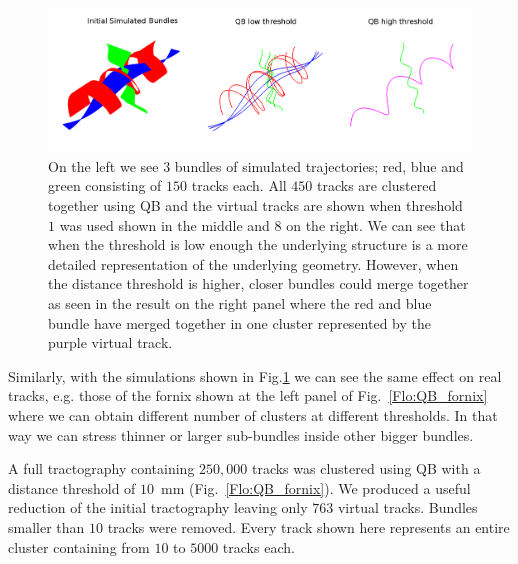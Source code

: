 \documentclass[preprint,authoryear,a4paper,10pt,onecolumn]{elsarticle}
\begin{document}
\begin{figure}
\begin{centering}
\includegraphics[scale=0.7]{last_figures/helix_phantom}
\par\end{centering}
\caption{On the left we see $3$ bundles of simulated trajectories; red,
  blue and green consisting of $150$ tracks each. All $450$ tracks are
  clustered together using QB and the virtual tracks are shown when
  threshold $1$ was used shown in the middle and $8$ on the right.  We
  can see that when the threshold is low enough the underlying structure
  is a more detailed representation of the underlying geometry. However,
  when the distance threshold is higher, closer bundles could merge
  together as seen in the result on the right panel where the red and
  blue bundle have merged together in one cluster represented by the
  purple virtual track.\label{Flo:simulated_orbits}}
\end{figure}

Similarly, with the simulations shown in Fig.\ref{Flo:simulated_orbits}
we can see the same effect on real tracks, e.g. those of the fornix
shown at the left panel of Fig.~\ref{Flo:QB_fornix} where we can obtain
different number of clusters at different thresholds. In that way we can
stress thinner or larger sub-bundles inside other bigger bundles. 

A full tractography containing $250,000$ tracks was clustered using QB
with a distance threshold of $10$~mm (Fig.~\ref{Flo:QB_fornix}).  We
produced a useful reduction of the initial tractography leaving only
$763$ virtual tracks. Bundles smaller than $10$ tracks were
removed. Every track shown here represents an entire cluster containing
from $10$ to $5000$ tracks each.
\end{document}
